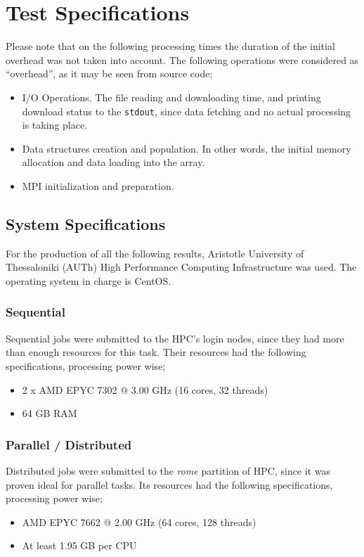 \documentclass[11pt]{article}
\begin{document}
\section{Test Specifications}
\label{sec:org7b7d8b9}
Please note that on the following processing times the duration of the initial overhead was not taken into account. The following operations were considered as ``overhead'', as it may be seen from source code;
\begin{itemize}
\item I/O Operations. The file reading and downloading time, and printing download status to the \texttt{stdout}, since data fetching and no actual processing is taking place.
\item Data structures creation and population. In other words, the initial memory allocation and data loading into the array.
\item MPI initialization and preparation.
\end{itemize}
\subsection{System Specifications}
\label{sec:org4bf409e}
For the production of all the following results, Aristotle University of Thessaloniki (AUTh) High Performance Computing Infrastructure was used. The operating system in charge is CentOS. \autocite{hpc-resources}
\subsubsection{Sequential}
\label{sec:org83aeb5e}
Sequential jobs were submitted to the HPC's login nodes, since they had more than enough resources for this task. Their resources had the following specifications, processing power wise;
\begin{itemize}
\item 2 x AMD EPYC 7302 @ 3.00 GHz (16 cores, 32 threads)
\item 64 GB RAM
\end{itemize}
\subsubsection{Parallel / Distributed}
\label{sec:org218b544}
Distributed jobs were submitted to the \emph{rome} partition of HPC, since it was proven ideal for parallel tasks. Its resources had the following specifications, processing power wise;
\begin{itemize}
\item AMD EPYC 7662 @ 2.00 GHz (64 cores, 128 threads) \autocite{hpc-resources}
\item At least 1.95 GB per CPU
\end{itemize}
\end{document}
